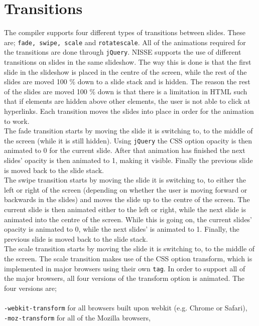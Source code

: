 \section{Transitions}
The compiler supports four different types of transitions between slides. These are; \lstinline!fade, swipe, scale! and \lstinline!rotatescale!. All of the animations required for the transitions are done through \texttt{jQuery}. NISSE supports the use of different transitions on slides in the same slideshow. The way this is done is that the first slide in the slideshow is placed in the centre of the screen, while the rest of the slides are moved 100 \% down to a slide stack and is hidden. The reason the rest of the slides are moved 100 \% down is that there is a limitation in HTML such that if elements are hidden above other elements, the user is not able to click at hyperlinks. Each transition moves the slides into place in order for the animation to work.\\
The fade transition starts by moving the slide it is switching to, to the middle of the screen (while it is still hidden). Using \texttt{jQuery} the CSS option opacity is then animated to 0 for the current slide. After that animation has finished the next slides' opacity is then animated to 1, making it visible. Finally the previous slide is moved back to the slide stack. \\
The swipe transition starts by moving the slide it is switching to, to either the left or right of the screen (depending on whether the user is moving forward or backwards in the slides) and moves the slide up to the centre of the screen. The current slide is then animated either to the left or right, while the next slide is animated into the centre of the screen. While this is going on, the current slides' opacity is animated to 0, while the next slides' is animated to 1. Finally, the previous slide is moved back to the slide stack. \\
The scale transition starts by moving the slide it is switching to, to the middle of the screen. The scale transition makes use of the CSS option transform, which is implemented in major browsers using their own \texttt{tag}. In order to support all of the major browsers, all four versions of the transform option is animated. The four versions are; \\ \\
\texttt{-webkit-transform} for all browsers built upon webkit (e.g. Chrome or Safari), \\
\texttt{-moz-transform} for all of the Mozilla browsers, \\
